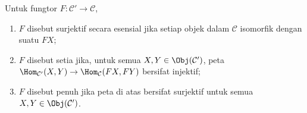 \begin{definition}
	Untuk fungtor $F:  \mathcal{C}' \to \mathcal{C}$,
	\begin{enumerate}
		\item $F$ disebut surjektif secara esensial jika setiap objek dalam $\mathcal{C}$ isomorfik dengan suatu $FX$;
		\item $F$ disebut setia jika, untuk semua $X, Y \in \Obj(\mathcal{C}')$, peta $\Hom_{\mathcal{C}'}(X, Y) \to \Hom_{\mathcal{C}}(FX, FY) $ bersifat injektif;
		\item $F$ disebut penuh jika peta di atas bersifat surjektif untuk semua $X, Y \in \Obj(\mathcal{C}')$.
	\end{enumerate}
\end{definition}

